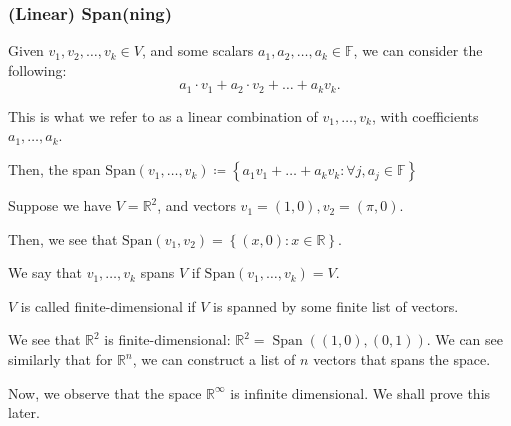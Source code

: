 \documentclass[openany]{book}
\newcommand{\RR}{\mathbb{R}}
\DeclareMathOperator*{\Span}{Span}
\begin{document}
	\subsubsection{(Linear) Span(ning)}
	\begin{defn}[Span]
		Given $v_{1}, v_{2}, \ldots, v_{k} \in V$, and some scalars $a_{1}, a_{2}, \ldots, a_{k} \in \mathbb{F}$, we can consider the following:
		\begin{equation*}
			a_{1} \cdot v_{1} + a_{2} \cdot v_{2} + \ldots + a_{k} v_{k}.
		\end{equation*}
		
		This is what we refer to as a linear combination of $v_{1}, \ldots, v_{k}$, with coefficients $a_{1}, \ldots, a_{k}$.
		
		Then, the span $\mathrm{Span}(v_{1}, \ldots, v_{k}) \coloneq \left\{  a_{1}v_{1} + \ldots + a_{k}v_{k} : \forall j, a_{j} \in \mathbb{F} \right\}$
	\end{defn}
	
	\begin{example}
		Suppose we have $V = \RR^{2}$, and vectors $v_{1} = \left( 1,0 \right), v_{2} = \left( \pi, 0 \right)$.
		
		Then, we see that $\mathrm{Span}(v_{1}, v_{2}) = \left\{  (x,0) : x \in \RR \right\}$.
	\end{example}
	
	We say that $v_{1}, \ldots, v_{k}$ spans $V$ if $\mathrm{Span}(v_{1}, \ldots, v_{k}) = V$.
	
	\begin{defn}
		$V$ is called finite-dimensional if $V$ is spanned by some finite list of vectors.
	\end{defn}
	\begin{example}
		We see that $\RR^{2}$ is finite-dimensional: $\RR^{2} = \Span\left( (1,0), (0,1) \right)$. We can see similarly that for $\RR^{n}$, we can construct a list of $n$ vectors that spans the space.
		
		Now, we observe that the space $\RR^{\infty}$ is infinite dimensional. We shall prove this later.
	\end{example}
	
\end{document}
